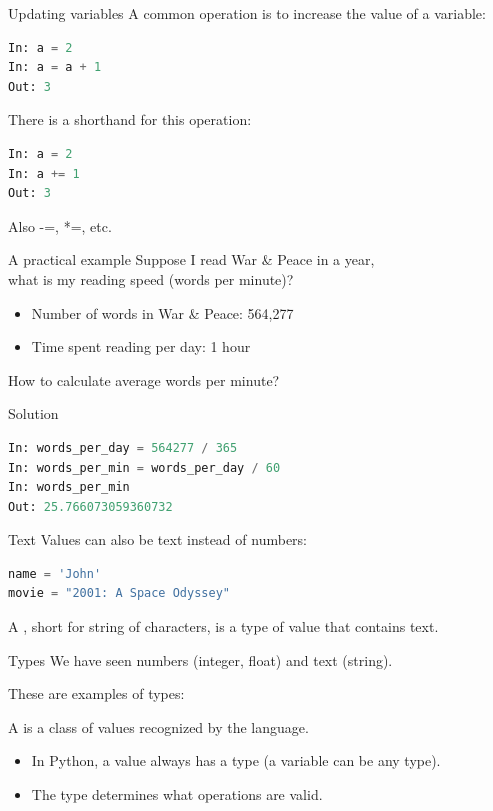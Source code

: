\documentclass[aspectratio=169,usenames,dvipsnames]{beamer}
\begin{document}
\begin{frame}[fragile]{Updating variables}
A common operation is to increase the value of a variable:
\begin{lstlisting}[language=python]
In: a = 2
In: a = a + 1
Out: 3
\end{lstlisting}

\pause
There is a shorthand for this operation:
\begin{lstlisting}[language=python]
In: a = 2
In: a += 1
Out: 3
\end{lstlisting}

Also -=, *=, etc.
\end{frame}


\begin{frame}{A practical example}
    Suppose I read War \& Peace in a year, \\
    what is my reading speed (words per minute)?
    \begin{itemize}
        \item Number of words in War \& Peace: 564,277
        \item Time spent reading per day: 1 hour
    \end{itemize}
    How to calculate average words per minute?
\end{frame}

\begin{frame}[fragile]{Solution}
\begin{lstlisting}[language=python]
In: words_per_day = 564277 / 365
In: words_per_min = words_per_day / 60
In: words_per_min
Out: 25.766073059360732
\end{lstlisting}
\end{frame}


\begin{frame}[fragile]{Text}
Values can also be text instead of numbers:
\begin{lstlisting}[language=python]
name = 'John'
movie = "2001: A Space Odyssey"
\end{lstlisting}

\pause
    \begin{definition}
        A , short for string of characters,
        is a type of value that contains text.
    \end{definition}
\end{frame}

\begin{frame}{Types}
    We have seen numbers (integer, float) and text (string).

    These are examples of types:

    \begin{definition}
        A  is a class of values recognized by the language.
    \end{definition}
    
    \pause
    \begin{itemize}
        \item In Python, a value always has a type (a variable can be any type).
        \item The type determines what operations are valid.
    \end{itemize}
\end{frame}
\end{document}
